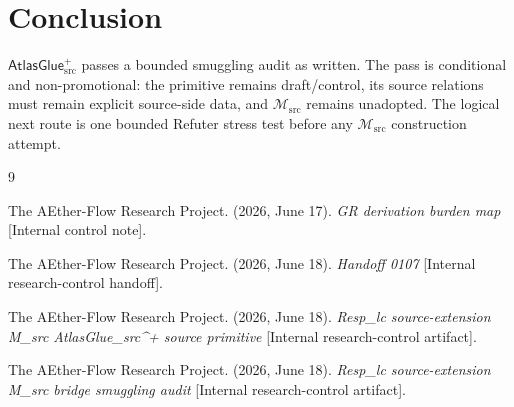 \documentclass[11pt]{article}
\newcommand{\Msrc}{\mathcal{M}_{\mathrm{src}}}
\newcommand{\AtlasGlue}{\mathsf{AtlasGlue}_{\mathrm{src}}^{+}}
\begin{document}
\section{Conclusion}

\(\AtlasGlue\) passes a bounded smuggling audit as written. The pass is
conditional and non-promotional: the primitive remains draft/control, its
source relations must remain explicit source-side data, and \(\Msrc\) remains
unadopted. The logical next route is one bounded Refuter stress test before
any \(\Msrc\) construction attempt.

\begin{thebibliography}{9}

The AEther-Flow Research Project. (2026, June 17). \emph{GR derivation burden
map} [Internal control note].

The AEther-Flow Research Project. (2026, June 18). \emph{Handoff 0107}
[Internal research-control handoff].

The AEther-Flow Research Project. (2026, June 18). \emph{Resp\_lc
source-extension M\_src AtlasGlue\_src\^{}+ source primitive} [Internal
research-control artifact].

The AEther-Flow Research Project. (2026, June 18). \emph{Resp\_lc
source-extension M\_src bridge smuggling audit} [Internal research-control
artifact].

\end{thebibliography}
\end{document}
